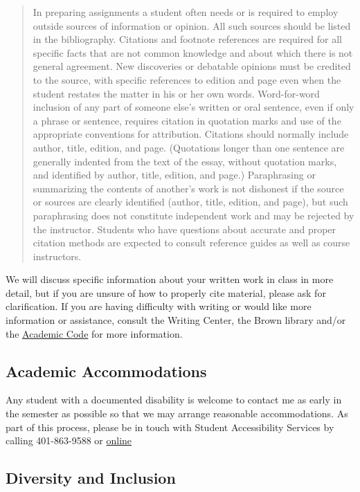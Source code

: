 \begin{quote}
In preparing assignments a student often needs or is required to employ outside sources of information or opinion. All such sources should be listed in the bibliography. Citations and footnote references are required for all specific facts that are not common knowledge and about which there is not general agreement. New discoveries or debatable opinions must be credited to the source, with specific references to edition and page even when the student restates the matter in his or her own words. Word-for-word inclusion of any part of someone else's written or oral sentence, even if only a phrase or sentence, requires citation in quotation marks and use of the appropriate conventions for attribution. Citations should normally include author, title, edition, and page. (Quotations longer than one sentence are generally indented from the text of the essay, without quotation marks, and identified by author, title, edition, and page.) Paraphrasing or summarizing the contents of another's work is not dishonest if the source or sources are clearly identified (author, title, edition, and page), but such paraphrasing does not constitute independent work and may be rejected by the instructor. Students who have questions about accurate and proper citation methods are expected to consult reference guides as well as course instructors.
\end{quote}

We will discuss specific information about your written work in class in more detail, but if you are unsure of how to properly cite material, please ask for clarification. If you are having difficulty with writing or would like more information or assistance, consult the Writing Center, the Brown library and/or the \href{https://www.brown.edu/academics/college/degree/policies/academic-code}{Academic Code} for more information.


\subsection{Academic Accommodations}
Any student with a documented disability is welcome to contact me as early in the semester as possible so that we may arrange reasonable accommodations. As part of this process, please be in touch with Student Accessibility Services by calling 401-863-9588 or \href{http://brown.edu/Student_Services/Office_of_Student_Life/seas/index.html}{online}

\subsection{Diversity and Inclusion}

